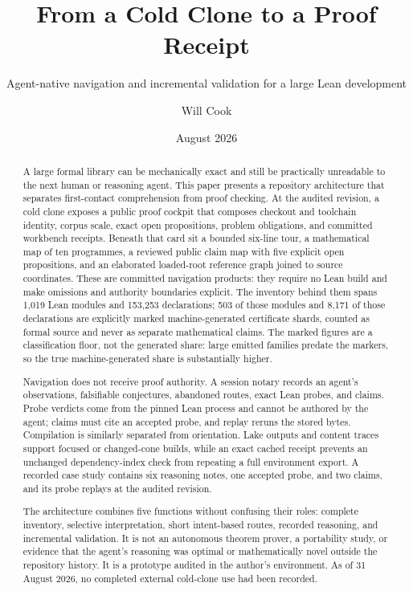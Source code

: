 \documentclass[11pt]{article}
\title{From a Cold Clone to a Proof Receipt}
\subtitle{Agent-native navigation and incremental validation for a large Lean development}
\author{Will Cook}
\date{August 2026}
\begin{document}
\maketitle
\paperprovenance

\begin{abstract}
A large formal library can be mechanically exact and still be practically
unreadable to the next human or reasoning agent. This paper presents a
repository architecture that separates first-contact comprehension from proof
checking. At the audited revision, a cold clone exposes a public proof cockpit
that composes checkout and toolchain identity, corpus scale, exact open
propositions, problem obligations, and committed workbench receipts. Beneath
that card sit a bounded six-line tour, a mathematical map of ten programmes, a
reviewed public claim map with five explicit open propositions, and an
elaborated loaded-root reference graph joined to source coordinates. These are
committed navigation products: they require no Lean build and make omissions
and authority boundaries explicit.
The inventory behind them spans 1,019 Lean modules and 153,253 declarations;
503 of those modules and 8,171 of those declarations are explicitly marked
machine-generated certificate shards, counted as formal source and never as
separate mathematical claims.  The marked figures are a classification
floor, not the generated share: large emitted families predate the markers,
so the true machine-generated share is substantially higher.

Navigation does not receive proof authority. A session notary records an
agent's observations, falsifiable conjectures, abandoned routes, exact Lean
probes, and claims. Probe verdicts come from the pinned Lean process and cannot
be authored by the agent; claims must cite an accepted probe, and replay reruns
the stored bytes. Compilation is similarly separated from orientation. Lake
outputs and content traces support focused or changed-cone builds, while an
exact cached receipt prevents an unchanged dependency-index check from
repeating a full environment export. A recorded case study contains six reasoning
notes, one accepted probe, and two claims, and its probe replays at the audited
revision.

The architecture combines five functions without confusing their roles:
complete inventory, selective interpretation, short intent-based routes,
recorded reasoning, and incremental validation. It is not an autonomous theorem
prover, a portability study, or evidence that the agent's reasoning was optimal
or mathematically novel outside the repository history. It is a prototype
audited in the author's environment. As of 31 August 2026, no completed
external cold-clone use had been recorded.
\end{abstract}
\end{document}
